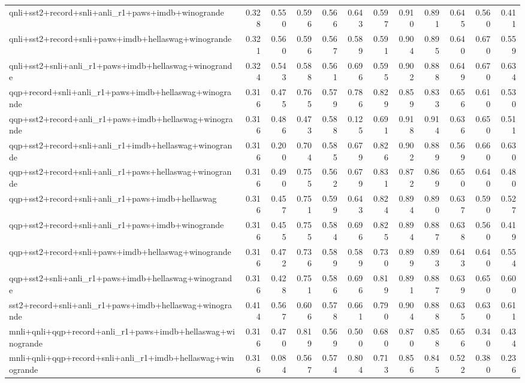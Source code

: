 \begin{table}[t]
\begin{tabular}{lrrrrrrrrrrr}
    qnli+sst2+record+snli+anli\_r1+paws+imdb+winogrande & 0.328 & 0.550 & 0.596 & 0.566 & 0.643 & 0.597 & 0.910 & 0.891 & 0.645 & 0.560 & 0.411 \\
    qnli+sst2+record+snli+paws+imdb+hellaswag+winogrande & 0.321 & 0.560 & 0.596 & 0.567 & 0.589 & 0.591 & 0.904 & 0.895 & 0.640 & 0.670 & 0.559 \\
    qnli+sst2+snli+anli\_r1+paws+imdb+hellaswag+winogrande & 0.324 & 0.543 & 0.588 & 0.561 & 0.696 & 0.595 & 0.902 & 0.888 & 0.649 & 0.670 & 0.634 \\
    qqp+record+snli+anli\_r1+paws+imdb+hellaswag+winogrande & 0.316 & 0.475 & 0.765 & 0.579 & 0.786 & 0.829 & 0.859 & 0.833 & 0.656 & 0.610 & 0.530 \\
    qqp+sst2+record+anli\_r1+paws+imdb+hellaswag+winogrande & 0.316 & 0.486 & 0.473 & 0.588 & 0.125 & 0.691 & 0.918 & 0.914 & 0.636 & 0.650 & 0.511 \\
    qqp+sst2+record+snli+anli\_r1+imdb+hellaswag+winogrande & 0.316 & 0.200 & 0.704 & 0.585 & 0.679 & 0.826 & 0.902 & 0.889 & 0.569 & 0.660 & 0.630 \\
    qqp+sst2+record+snli+anli\_r1+paws+hellaswag+winogrande & 0.316 & 0.490 & 0.755 & 0.562 & 0.679 & 0.831 & 0.872 & 0.869 & 0.650 & 0.640 & 0.480 \\
    qqp+sst2+record+snli+anli\_r1+paws+imdb+hellaswag & 0.316 & 0.457 & 0.751 & 0.599 & 0.643 & 0.824 & 0.894 & 0.890 & 0.637 & 0.590 & 0.527 \\
    qqp+sst2+record+snli+anli\_r1+paws+imdb+winogrande & 0.316 & 0.455 & 0.755 & 0.584 & 0.696 & 0.825 & 0.894 & 0.887 & 0.638 & 0.560 & 0.419 \\
    qqp+sst2+record+snli+paws+imdb+hellaswag+winogrande & 0.316 & 0.472 & 0.736 & 0.589 & 0.589 & 0.730 & 0.899 & 0.893 & 0.643 & 0.640 & 0.554 \\
    qqp+sst2+snli+anli\_r1+paws+imdb+hellaswag+winogrande & 0.316 & 0.428 & 0.751 & 0.586 & 0.696 & 0.819 & 0.891 & 0.887 & 0.639 & 0.650 & 0.600 \\
    sst2+record+snli+anli\_r1+paws+imdb+hellaswag+winogrande & 0.414 & 0.567 & 0.606 & 0.578 & 0.661 & 0.790 & 0.904 & 0.888 & 0.635 & 0.630 & 0.611 \\
    \addlinespace
    mnli+qnli+qqp+record+anli\_r1+paws+imdb+hellaswag+winogrande & 0.316 & 0.470 & 0.819 & 0.569 & 0.500 & 0.680 & 0.870 & 0.858 & 0.656 & 0.340 & 0.434 \\
    mnli+qnli+qqp+record+snli+anli\_r1+imdb+hellaswag+winogrande & 0.316 & 0.084 & 0.567 & 0.574 & 0.804 & 0.713 & 0.856 & 0.845 & 0.522 & 0.380 & 0.236 \\

\end{tabular}
\end{table}
